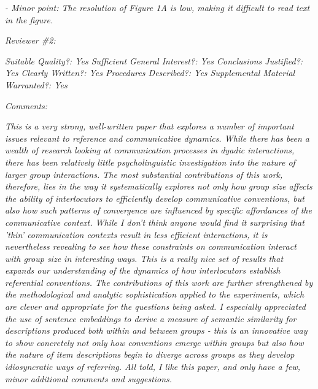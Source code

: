 \documentclass{stanfordletter}
\newcommand{\theysaid}[1]{\begin{leftbar} \noindent 
		\textsl{ #1}\end{leftbar}}
\begin{document}
\begin{letter}{}
          \theysaid{- Minor point: The resolution of Figure 1A is low, making it difficult to read text in the figure.}
          
          
          \theysaid{Reviewer \#2:}
          
          \theysaid{Suitable Quality?: Yes
          Sufficient General Interest?: Yes
          Conclusions Justified?: Yes
          Clearly Written?: Yes
          Procedures Described?: Yes
          Supplemental Material Warranted?: Yes}
          
          \theysaid{Comments:}
          \theysaid{This is a very strong, well-written paper that explores a number of important issues relevant to reference and communicative dynamics. While there has been a wealth of research looking at communication processes in dyadic interactions, there has been relatively little psycholinguistic investigation into the nature of larger group interactions. The most substantial contributions of this work, therefore, lies in the way it systematically explores not only how group size affects the ability of interlocutors to efficiently develop communicative conventions, but also how such patterns of convergence are influenced by specific affordances of the communicative context. While I don't think anyone would find it surprising that 'thin' communication contexts result in less efficient interactions, it is nevertheless revealing to see how these constraints on communication interact with group size in interesting ways. This is a really nice set of results that expands our understanding of the dynamics of how interlocutors establish referential conventions. The contributions of this work are further strengthened by the methodological and analytic sophistication applied to the experiments, which are clever and appropriate for the questions being asked. I especially appreciated the use of sentence embeddings to derive a measure of semantic similarity for descriptions produced both within and between groups - this is an innovative way to show concretely not only how conventions emerge within groups but also how the nature of item descriptions begin to diverge across groups as they develop idiosyncratic ways of referring. All told, I like this paper, and only have a few, minor additional comments and suggestions.}
          

\end{letter}
\end{document}
